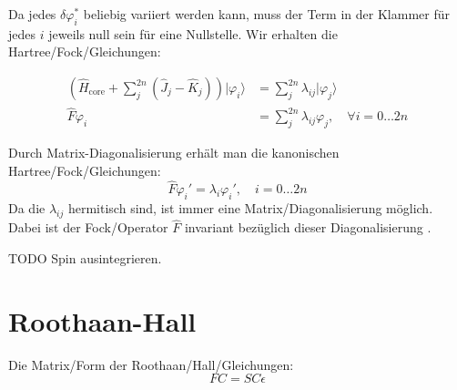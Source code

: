 Da jedes $\delta \varphi_i^*$ beliebig variiert werden kann,
muss der Term in der Klammer für jedes $i$ jeweils null sein für eine Nullstelle.
Wir erhalten die Hartree\-/Fock\-/Gleichungen:


\begin{align} \label{uhf}
  \left(\hat{H}_{\text{core}} + \sum_j^{2n} 
  \left( \hat{J}_j - \hat{K}_j \right)\right)\vert\varphi_i\rangle &= 
  \sum_j^{2n}\lambda_{ij} \vert\varphi_j\rangle \nonumber\\
  \hat{F}\varphi_i &= \sum_j^{2n}\lambda_{ij} \varphi_j, \quad \forall i = 0 \dots 2n
\end{align}

Durch Matrix-Diagonalisierung erhält man die kanonischen Hartree\-/Fock\-/Gleichungen:
\begin{equation} \label{uhf_can}
  \hat{F} \varphi_i' = \lambda_i \varphi_i', \quad i = 0 \dots 2n
\end{equation}
Da die $\lambda_{ij}$ hermitisch sind, ist immer eine Matrix\-/Diagonalisierung möglich.
Dabei ist der Fock\-/Operator $\hat{F}$ invariant bezüglich dieser Diagonalisierung
\cite[3.64]{szabo_ostlund_1996}.

\cite[S. 253]{atkins_friedman_2011}
\cite[S. 115-119]{szabo_ostlund_1996}

TODO Spin ausintegrieren.

\section{Roothaan-Hall}
Die Matrix\-/Form der Roothaan\-/Hall\-/Gleichungen:
\begin{equation} \label{roothaan}
  FC = SC\epsilon
\end{equation}

